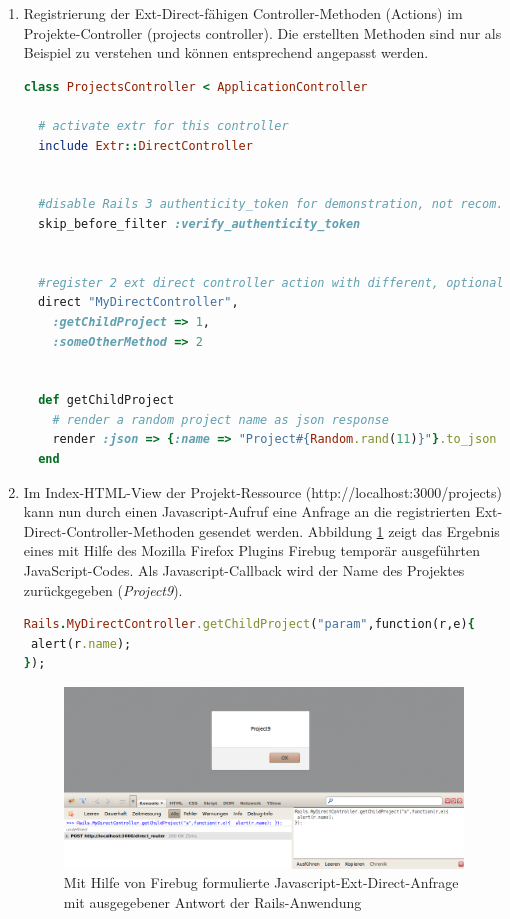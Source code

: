 \begin{enumerate}
\item
Registrierung der Ext-Direct-fähigen Controller-Methoden (Actions) im Projekte-Controller (projects controller). Die erstellten Methoden sind nur als Beispiel zu verstehen und können entsprechend angepasst werden.

\begin{lstlisting}[language=ruby,frame=single,title=\emph{app/controllers/projects\_controller.rb}, numbers=none]
class ProjectsController < ApplicationController

  # activate extr for this controller
  include Extr::DirectController


  #disable Rails 3 authenticity_token for demonstration, not recom. in production
  skip_before_filter :verify_authenticity_token


  #register 2 ext direct controller action with different, optional controller name (MyDirectController)
  direct "MyDirectController",
    :getChildProject => 1,
    :someOtherMethod => 2


  def getChildProject
    # render a random project name as json response
    render :json => {:name => "Project#{Random.rand(11)}"}.to_json
  end

\end{lstlisting}

\item
Im Index-HTML-View der Projekt-Ressource (http://localhost:3000/projects) kann nun durch einen Javascript-Aufruf eine Anfrage an die registrierten Ext-Direct-Controller-Methoden gesendet werden. Abbildung \ref{extrreqeust} zeigt das Ergebnis eines mit Hilfe des Mozilla Firefox Plugins Firebug temporär ausgeführten JavaScript-Codes.
Als Javascript-Callback wird der Name des Projektes zurückgegeben (\emph{Project9}).
\begin{lstlisting}[language=ruby,frame=single,title=\emph{Javascript zum Aufruf des Projekt-Controllers in der Rails-Anwendung}]
Rails.MyDirectController.getChildProject("param",function(r,e){
 alert(r.name);
});

\end{lstlisting}

\begin{figure}[!h]
\begin{center}
\includegraphics[scale=0.4]{images/anhang/extrbrowserrequest.png}
\caption{Mit Hilfe von Firebug formulierte Javascript-Ext-Direct-Anfrage mit ausgegebener Antwort der Rails-Anwendung}
\label{extrreqeust}
\end{center}
\end{figure}
\end{enumerate}

%

